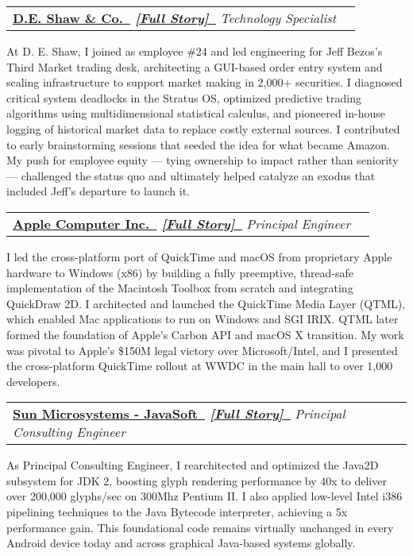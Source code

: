 \documentclass[letterpaper,11pt]{article}
\makeatletter
\newcommand{\resumeItem}[1]{
  \item\small{
    {#1 \vspace{-2pt}}
  }
}
\newcommand{\resumeSubheading}[4]{
  \vspace{-2pt}\item
    \begin{tabular*}{1.0\textwidth}[t]{l@{\extracolsep{\fill}}r}
      \textbf{#1}  \textit{\small#3} & \textbf{\small #2} \\
    \end{tabular*}\vspace{-7pt}
}
\makeatother
\begin{document}
\resumeSubheading
    {\href{https://www.deshaw.com}{D.E. Shaw \& Co.~\faExternalLink}
    \quad\small
    \textit
        {\href {https://paul-charlton.vercel.app/story/25}{[Full Story]~{\fontspec{Symbola}\symbol{"1F517}}}}
    }
    {}
    {Technology Specialist}
    {New York, NY}
\resumeItem{
    At D. E. Shaw, I joined as employee \#24 and led engineering for Jeff Bezos’s Third Market trading desk, architecting a GUI-based order entry system and scaling infrastructure to support market making in 2,000+ securities. I diagnosed critical system deadlocks in the Stratus OS, optimized predictive trading algorithms using multidimensional statistical calculus, and pioneered in-house logging of historical market data to replace costly external sources. I contributed to early brainstorming sessions that seeded the idea for what became Amazon. My push for employee equity — tying ownership to impact rather than seniority — challenged the status quo and ultimately helped catalyze an exodus that included Jeff’s departure to launch it.
}

\resumeSubheading
    {\href{https://www.apple.com}{Apple Computer Inc.~\faExternalLink}
    \quad\small
    \textit
        {\href{https://paul-charlton.vercel.app/story/11}{[Full Story]~{\fontspec{Symbola}\symbol{"1F517}}}}
    }
    {}
    {Principal Engineer}
    {Cupertino, CA}
\resumeItem{
    I led the cross-platform port of QuickTime and macOS from proprietary Apple hardware to Windows (x86) by building a fully preemptive, thread-safe implementation of the Macintosh Toolbox from scratch and integrating QuickDraw 2D. I architected and launched the QuickTime Media Layer (QTML), which enabled Mac applications to run on Windows and SGI IRIX. QTML later formed the foundation of Apple’s Carbon API and macOS X transition. My work was pivotal to Apple’s \$150M legal victory over Microsoft/Intel, and I presented the cross-platform QuickTime rollout at WWDC in the main hall to over 1,000 developers.
}

\resumeSubheading
    {\href{https://www.oracle.com/sun}{Sun Microsystems - JavaSoft~\faExternalLink}
    \quad\small
    \textit{
        \href{https://paul-charlton.vercel.app/story/5}{[Full Story]~{\fontspec{Symbola}\symbol{"1F517}}}}
    }
    {}
    {Principal Consulting Engineer}
    {Palo Alto, CA}
\resumeItem{
    As Principal Consulting Engineer, I rearchitected and optimized the Java2D subsystem for JDK 2, boosting glyph rendering performance by 40x to deliver over 200,000 glyphs/sec on 300Mhz Pentium II. I also applied low-level Intel i386 pipelining techniques to the Java Bytecode interpreter, achieving a 5x performance gain. This foundational code remains virtually unchanged in every Android device today and across graphical Java-based systems globally.
}
\end{document}
